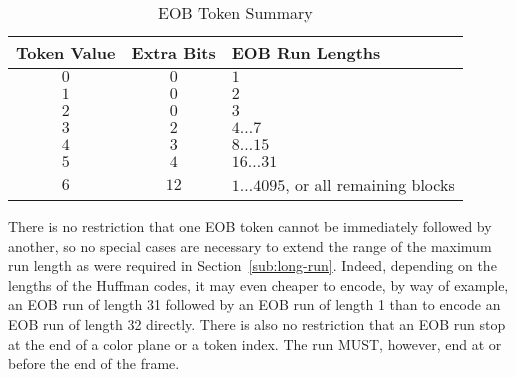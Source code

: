 \documentclass[9pt,letterpaper]{book}
\numberwithin{equation}{chapter}
\numberwithin{figure}{chapter}
\numberwithin{table}{chapter}
\begin{document}
\begin{table}[htbp]
\begin{center}
\begin{tabular}{ccl}\toprule
Token Value  & Extra Bits & EOB Run Lengths                         \\\midrule
$0$          & $0$        & $1$                                     \\
$1$          & $0$        & $2$                                     \\
$2$          & $0$        & $3$                                     \\
$3$          & $2$        & $4\ldots 7$                             \\
$4$          & $3$        & $8\ldots 15$                            \\
$5$          & $4$        & $16\ldots 31$                           \\
$6$          & $12$       & $1\ldots 4095$, or all remaining blocks \\
\bottomrule\end{tabular}
\end{center}
\caption{EOB Token Summary}
\label{tab:eob-tokens}
\end{table}

There is no restriction that one EOB token cannot be immediately followed by
 another, so no special cases are necessary to extend the range of the maximum
 run length as were required in Section~\ref{sub:long-run}.
Indeed, depending on the lengths of the Huffman codes, it may even cheaper to
 encode, by way of example, an EOB run of length 31 followed by an EOB run of
 length 1 than to encode an EOB run of length 32 directly.
There is also no restriction that an EOB run stop at the end of a color plane
 or a token index.
The run MUST, however, end at or before the end of the frame.
\end{document}
